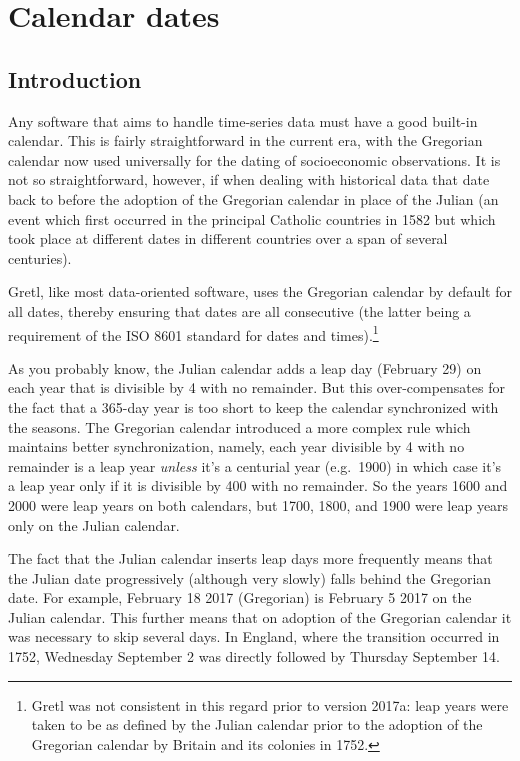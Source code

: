 \chapter{Calendar dates}
\label{chap:calendar}

\section{Introduction}
\label{cal-intro}

Any software that aims to handle time-series data must have a good
built-in calendar. This is fairly straightforward in the current era,
with the Gregorian calendar now used universally for the dating of
socioeconomic observations. It is not so straightforward, however, if
when dealing with historical data that date back to before the
adoption of the Gregorian calendar in place of the Julian (an event
which first occurred in the principal Catholic countries in 1582 but
which took place at different dates in different countries over a span
of several centuries).

Gretl, like most data-oriented software, uses the Gregorian calendar
by default for all dates, thereby ensuring that dates are all
consecutive (the latter being a requirement of the ISO 8601 standard
for dates and times).\footnote{Gretl was not consistent in this regard
  prior to version 2017a: leap years were taken to be as defined by
  the Julian calendar prior to the adoption of the Gregorian calendar
  by Britain and its colonies in 1752.}

As you probably know, the Julian calendar adds a leap day (February
29) on each year that is divisible by 4 with no remainder. But this
over-compensates for the fact that a 365-day year is too short to keep
the calendar synchronized with the seasons. The Gregorian calendar
introduced a more complex rule which maintains better synchronization,
namely, each year divisible by 4 with no remainder is a leap year
\textit{unless} it's a centurial year (e.g.\ 1900) in which case it's
a leap year only if it is divisible by 400 with no remainder.  So the
years 1600 and 2000 were leap years on both calendars, but 1700, 1800,
and 1900 were leap years only on the Julian calendar.

The fact that the Julian calendar inserts leap days more frequently
means that the Julian date progressively (although very slowly) falls
behind the Gregorian date. For example, February 18 2017 (Gregorian)
is February 5 2017 on the Julian calendar. This further means that on
adoption of the Gregorian calendar it was necessary to skip several
days. In England, where the transition occurred in 1752, Wednesday
September 2 was directly followed by Thursday September 14.


